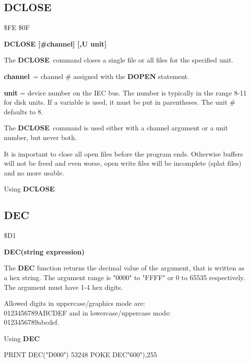 \subsection{DCLOSE}
\begin{description}[leftmargin=3cm,style=nextline]
\item [Token:] \$FE \$0F
\item [Format:] {\bf DCLOSE [\#channel] [,U unit] }
\item [Usage:]
   The {\bf DCLOSE} command closes a single file or
   all files for the specified unit.

   {\bf channel} = channel \# assigned with the {\bf DOPEN} statement.

   {\bf unit} = device number on the IEC bus.
   The number is typically in the range 8-11 for disk units.
   If a variable is used, it must be put in parentheses.
   The unit \# defaults to 8.

   The {\bf DCLOSE} command is used either with a channel argument
   or a unit number, but never both.

\item [Remarks:]
   It is important to close all open files before the program ends.
   Otherwise buffers will not be freed and even worse, open write
   files will be incomplete (splat files) and no more usable.

\item [Example:] Using {\bf DCLOSE}
\end{description}


\newpage
\subsection{DEC}
\begin{description}[leftmargin=3cm,style=nextline]
\item [Token:] \$D1
\item [Format:] {\bf DEC(string expression)}
\item [Usage:] The {\bf DEC} function returns the decimal value
               of the argument, that is written as a hex string.
               The argument range is "0000" to "FFFF" or
               0 to 65535 respectively.
               The argument must have 1-4 hex digits.

\item [Remarks:] Allowed digits in uppercase/graphics mode are: \\
                 0123456789ABCDEF and in lowercase/uppercase mode: \\
                 0123456789abcdef.

\item [Example:] Using {\bf DEC}
\begin{screenoutput}
  PRINT DEC("D000")
   53248
  POKE DEC"600"),255
\end{screenoutput}
\end{description}

